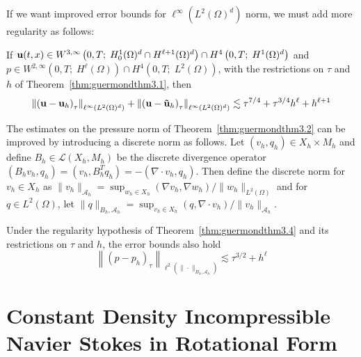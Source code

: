 \documentclass[letterpaper]{erdc}
\begin{document}
If we want improved error bounds for $\ell^{\infty}\left( L^2(\Omega)^d \right)$ norm, we must add more regularity as follows:
\begin{theorem}\label{thm:guermondthm3.4}
If $\textbf{u}(t,x)\in W^{3,\infty}\left(0,T;\; H_0^1(\Omega)^d \cap H^{\ell+1}(\Omega)^d  \right) \cap H^4\left(0,T;\; H^1(\Omega)^d\right)$ and $p\in W^{2,\infty}\left(0,T;\; H^{\ell}(\Omega) \right)\cap H^4\left(0,T;\; L^2(\Omega)\right)$, with the restrictions on $\tau$ and $h$ of Theorem~\ref{thm:guermondthm3.1}, then
  \begin{equation}
    \left\| \left(\textbf{u} - \textbf{u}_h \right)_{\tau} \right\|_{\ell^{\infty}\left(L^2(\Omega)^d\right)} + \left\| \left(\textbf{u} - \mathbf{\tilde{u}}_h \right)_{\tau} \right\|_{\ell^{\infty}\left(L^2(\Omega)^d\right)} \lesssim \tau^{7/4} + \tau^{3/4}h^{\ell} + h^{\ell+1}
  \end{equation}
\end{theorem}

The estimates on the pressure norm of Theorem~\ref{thm:guermondthm3.2} can be improved by introducing a discrete norm as follows.  Let $(v_h,q_h) \in X_h\times M_h$ and define $B_h \in \mathcal{L}(X_h,M_h)$ be the discrete divergence operator $(B_h v_h, q_h) = (v_h, B_h^T q_h) = -(\nabla\cdot v_h, q_h)$.  Then define the discrete norm for $v_h \in X_h$ as $\|v_h\|_{\mathcal{A}_h} = \sup_{w_h \in X_h} (\nabla v_h, \nabla w_h)/ \|w_h\|_{L^2(\Omega)}$ and for $q\in L^2(\Omega)$, let $\|q\|_{B_h, \mathcal{A}_h} = \sup_{v_h\in X_h} (q, \nabla\cdot v_h)/ \|v_h\|_{\mathcal{A}_h}$.

\begin{theorem}\label{thm:guermondthm3.5}
Under the regularity hypothesis of Theorem~\ref{thm:guermondthm3.4} and its restrictions on $\tau$ and $h$, the error bounds also hold
    \begin{equation}
      \left\| \left(p - p_h \right)_{\tau} \right\|_{\ell^{2}\left(\|\cdot\|_{B_h, \mathcal{A}_h}\right)} \lesssim \tau^{3/2} + h^{\ell}
    \end{equation}
\end{theorem}



\section{Constant Density Incompressible Navier Stokes in Rotational Form}
\end{document}
